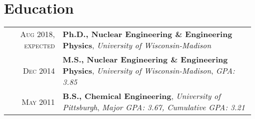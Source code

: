 
\vspace{0mm}
\section{Education}
\vspace{-1mm} \begin{tabular}{r|p{15cm}}

	\textsc{Aug 2018, expected} &
	\textbf{Ph.D., Nuclear Engineering \& Engineering Physics}, \emph{University of Wisconsin-Madison} \\
	\textsc{Dec 2014}  & 
	\textbf{M.S., Nuclear Engineering \& Engineering Physics}, \emph{University of Wisconsin-Madison}, \textit{GPA: 3.85} \\
	\textsc{May 2011} & \textbf{B.S., Chemical Engineering}, \emph{University of Pittsburgh}, \textit{Major GPA: 3.67, Cumulative GPA: 3.21 }

\end{tabular}
